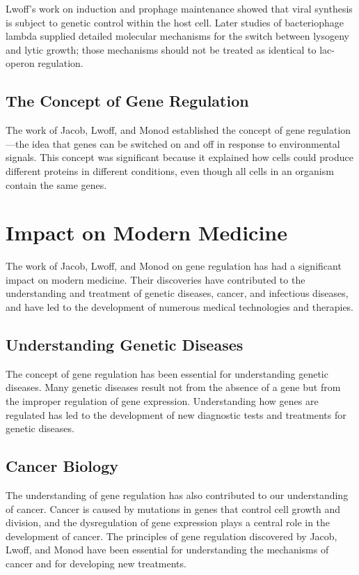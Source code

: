 Lwoff's work on induction and prophage maintenance showed that viral synthesis is subject to genetic control within the host cell. Later studies of bacteriophage lambda supplied detailed molecular mechanisms for the switch between lysogeny and lytic growth; those mechanisms should not be treated as identical to lac-operon regulation.

\subsection{The Concept of Gene Regulation}

The work of Jacob, Lwoff, and Monod established the concept of gene regulation---the idea that genes can be switched on and off in response to environmental signals. This concept was significant because it explained how cells could produce different proteins in different conditions, even though all cells in an organism contain the same genes.

\section{Impact on Modern Medicine}

The work of Jacob, Lwoff, and Monod on gene regulation has had a significant impact on modern medicine. Their discoveries have contributed to the understanding and treatment of genetic diseases, cancer, and infectious diseases, and have led to the development of numerous medical technologies and therapies.

\subsection{Understanding Genetic Diseases}

The concept of gene regulation has been essential for understanding genetic diseases. Many genetic diseases result not from the absence of a gene but from the improper regulation of gene expression. Understanding how genes are regulated has led to the development of new diagnostic tests and treatments for genetic diseases.

\subsection{Cancer Biology}

The understanding of gene regulation has also contributed to our understanding of cancer. Cancer is caused by mutations in genes that control cell growth and division, and the dysregulation of gene expression plays a central role in the development of cancer. The principles of gene regulation discovered by Jacob, Lwoff, and Monod have been essential for understanding the mechanisms of cancer and for developing new treatments.

